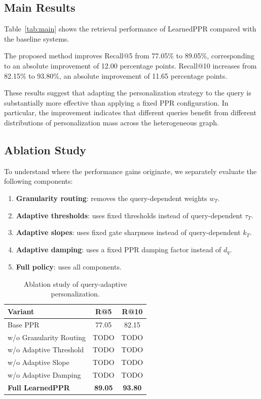\documentclass[conference]{IEEEtran}
\newcommand{\method}{LearnedPPR}
\newcommand{\q}{q}
\begin{document}
\subsection{Main Results}

Table~\ref{tab:main} shows the retrieval performance of \method
compared with the baseline systems.

The proposed method improves Recall@5 from 77.05\% to 89.05\%,
corresponding to an absolute improvement of 12.00 percentage points.
Recall@10 increases from 82.15\% to 93.80\%, an absolute improvement
of 11.65 percentage points.

These results suggest that adapting the personalization strategy to
the query is substantially more effective than applying a fixed PPR
configuration. In particular, the improvement indicates that
different queries benefit from different distributions of
personalization mass across the heterogeneous graph.


\subsection{Ablation Study}

To understand where the performance gains originate, we separately
evaluate the following components:

\begin{enumerate}
    \item \textbf{Granularity routing}: removes the
    query-dependent weights $w_T$.
    \item \textbf{Adaptive thresholds}: uses fixed thresholds instead
    of query-dependent $\tau_T$.
    \item \textbf{Adaptive slopes}: uses fixed gate sharpness instead
    of query-dependent $k_T$.
    \item \textbf{Adaptive damping}: uses a fixed PPR damping factor
    instead of $d_{\q}$.
    \item \textbf{Full policy}: uses all components.
\end{enumerate}

\begin{table}[t]
\centering
\caption{Ablation study of query-adaptive personalization.}
\label{tab:ablation}
\begin{tabular}{lcc}
\toprule
Variant & R@5 & R@10 \\
\midrule
Base PPR & 77.05 & 82.15 \\
w/o Granularity Routing & TODO & TODO \\
w/o Adaptive Threshold & TODO & TODO \\
w/o Adaptive Slope & TODO & TODO \\
w/o Adaptive Damping & TODO & TODO \\
\textbf{Full \method} & \textbf{89.05} & \textbf{93.80} \\
\bottomrule
\end{tabular}
\end{table}
\end{document}
